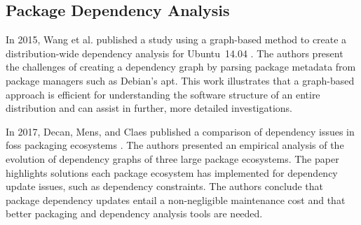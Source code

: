 \subsection{Package Dependency Analysis}


In 2015, Wang et al. published a study using a graph-based method to create a distribution-wide dependency analysis for Ubuntu~14.04 \cite{7490780}.
The authors present the challenges of creating a dependency graph by parsing package metadata from package managers such as Debian's \gls{apt}.
This work illustrates that a graph-based approach is efficient for understanding the software structure of an entire distribution and can assist in further, more detailed investigations.


In 2017, Decan, Mens, and Claes published a comparison of dependency issues in \gls{foss} packaging ecosystems \cite{7884604}.
The authors presented an empirical analysis of the evolution of dependency graphs of three large package ecosystems.
The paper highlights solutions each package ecosystem has implemented for dependency update issues, such as dependency constraints.
The authors conclude that package dependency updates entail a non-negligible maintenance cost and that better packaging and dependency analysis tools are needed.

